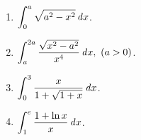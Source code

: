 \documentclass[a4paper,punct=CCT]{ctexbook}
\theoremstyle{break}
\newif\ifshowsol
\begin{document}
\begin{enumerate}
\item \(\displaystyle \int_0^a \sqrt{a^2 - x^2} \mathop{}\!\mathit{d} x\).

  \ifshowsol
  根据被积函数的几何意义, 有
  \[
    \int_0^a \sqrt{a^2 - x^2} \dx = \frac{\pi a^2}{4}.
  \]
  \fi

\item \(\displaystyle \int_a^{2a} \frac{\sqrt{x^2 - a^2}}{x^4} \mathop{}\!\mathit{d} x, \ (a > 0)\).

  \ifshowsol
  用\(x = a \sec t\)做换元, 有
  \[
    \begin{split}
      \int_a^{2a} \frac{\sqrt{x^2 - a^2}}{x^4} \dx
      &= \int_0^{\pi/3} \frac{\sqrt{a^2 \sec^2 t - a^2} \cdot a \tan t \sec t}{a^4 \sec^4 t} \dt
      = \frac{1}{a^2} \int_0^{\pi/3} \frac{\tan^2 t}{\sec^3 t} \dt \\
      &= \frac{1}{a^2} \int_0^{\pi/3} \sin^2 t \cos t \dt
      = \frac{1}{a^2} \int_0^{\sqrt3/2} u^2 \du \\
      &= \frac{1}{a^2} \frac{u^3}{3}\bigg\vert_0^{\sqrt3/2}
      = \frac{\sqrt3}{8a^2}.
    \end{split}
  \]
  也可以用\(x = a \cosh t\)做换元, 有
  \[
    \begin{split}
      \int_a^{2a} \frac{\sqrt{x^2 - a^2}}{x^4} \dx
      &= \int_0^{\arccosh2} \frac{\sqrt{a^2 \cosh^2 t - a^2} \cdot a \sinh t}{a^4 \cosh^4 t} \dt
      = \frac1{a^2} \int_0^{\arccosh2} \tanh^2 t \sech^2 t \dt \\
      &= \frac1{a^2} \int_0^{\tanh\arccosh2} u^2 \du
      = \frac1{a^2} \frac{u^3}{3} \bigg\vert_0^{\sqrt3/2}
      = \frac{\sqrt3}{8a^2}.
    \end{split}
  \]
  其中
  \[
    \tanh\arccosh2 = \tanh\arcsech\frac12 = \sqrt{1 - \sech^2\arcsech\frac12}
    = \sqrt{1 - \frac14} = \frac{\sqrt3}{2}.
  \]
  \fi

\item \(\displaystyle \int_0^3 \frac{x}{1 + \sqrt{1+x}} \mathop{}\!\mathit{d} x\).

  \ifshowsol
  用\(t = \sqrt{1+x}\)做换元, 有
  \[
    \int_0^3 \frac{x}{1 + \sqrt{1+x}} \dx
    = \int_1^2 \frac{t^2-1}{1+t} \cdot 2t \dt
    = 2 \int_1^2 \paren{t^2 - t} \dt
    = \frac{2}{3} t^3 \bigg\vert_1^2 - t^2 \bigg\vert_1^2
    = \frac53.
  \]
  \fi

\item \(\displaystyle \int_1^e \frac{1 + \ln x}{x} \mathop{}\!\mathit{d} x\).

  \ifshowsol
  \[
    \int_1^e \frac{1 + \ln x}{x} \dx
    = \int_1^e \frac{\dx}{x} + \int_1^e \frac{\ln x}{x} \dx
    = \ln x \bigg\vert_1^e + \frac{\ln^2 x}{2} \bigg\vert_1^e
    = 1 + \frac12 = \frac32.
  \]
  \fi


\end{enumerate}
\end{document}
